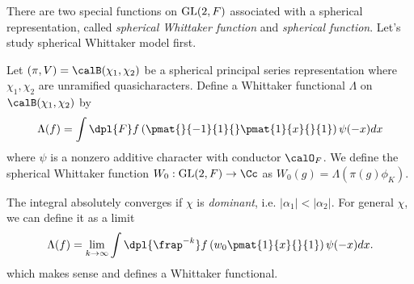 There are two special functions on $\mathrm{GL}(2, F)$ associated with a spherical representation, called \emph{spherical Whittaker function} and \emph{spherical function}. 
Let's study spherical Whittaker model first. 
\begin{definition}
Let $(\pi, V) = \calB(\chi_1, \chi_2)$ be a spherical principal series representation where $\chi_1, \chi_2$ are unramified quasicharacters. 
Define a Whittaker functional $\Lambda$ on $\calB(\chi_1, \chi_2)$ by 
$$
\Lambda(f) = \int\dpl{F} f\left( \pmat{}{-1}{1}{} \pmat{1}{x}{}{1}\right) \psi(-x) dx
$$
where $\psi$ is a nonzero additive character with conductor $\calO_F$. 
We define the spherical Whittaker function $W_{0}:\GL(2, F)\to \Cc$ as $W_{0}(g) = \Lambda(\pi(g)\phi_K)$. 
\end{definition}
The integral absolutely converges if $\chi$ is \emph{dominant}, i.e. $|\alpha_{1}| < |\alpha_{2}|$. 
For general $\chi$, we can define it as a limit
$$
\Lambda(f) = \lim_{k\to\infty} \int\dpl{\frap^{-k}} f\left( w_{0}\pmat{1}{x}{}{1}\right) \psi(-x)dx.
$$
which makes sense and defines a Whittaker functional. 

